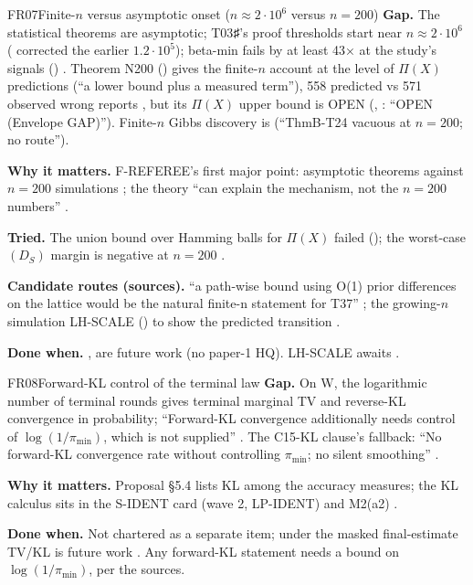 \begin{card}{FR07}{Finite-$n$ versus asymptotic onset ($n\approx2\cdot10^6$ versus $n=200$)}
\textbf{Gap.} The statistical theorems are asymptotic; T03♯'s proof thresholds start near $n\approx2\cdot10^6$ ( corrected the earlier $1.2\cdot10^5$); beta-min fails by at least 43× at the study's signals () . Theorem N200 () gives the finite-$n$ account at the level of $\Pi(X)$ predictions (``a lower bound plus a measured term''), 558 predicted vs 571 observed wrong reports , but its $\Pi(X)$ upper bound is OPEN (, : ``OPEN (Envelope GAP)''). Finite-$n$ Gibbs discovery is  (``ThmB-T24 vacuous at $n=200$; no route'').

\textbf{Why it matters.} F-REFEREE's first major point: asymptotic theorems against $n=200$ simulations ; the theory ``can explain the mechanism, not the $n=200$ numbers'' .

\textbf{Tried.} The union bound over Hamming balls for $\Pi(X)$ failed (); the worst-case $(D_S)$ margin is negative at $n=200$ .

\textbf{Candidate routes (sources).} ``a path-wise bound using O(1) prior differences on the lattice would be the natural finite-n statement for T37'' ; the growing-$n$ simulation LH-SCALE () to show the predicted transition .

\textbf{Done when.} ,  are future work (no paper-1 HQ). LH-SCALE awaits .
\end{card}

\begin{card}{FR08}{Forward-KL control of the terminal law}
\textbf{Gap.} On W, the logarithmic number of terminal rounds gives terminal marginal TV and reverse-KL convergence in probability; ``Forward-KL convergence additionally needs control of $\log(1/\pi_{\min})$, which is not supplied'' . The C15-KL clause's fallback: ``No forward-KL convergence rate without controlling $\pi_{\min}$; no silent smoothing'' .

\textbf{Why it matters.} Proposal §5.4 lists KL among the accuracy measures; the KL calculus sits in the S-IDENT card  (wave 2, LP-IDENT) and M2(a2) .

\textbf{Done when.} Not chartered as a separate item; under  the masked final-estimate TV/KL is future work . Any forward-KL statement needs a bound on $\log(1/\pi_{\min})$, per the sources.
\end{card}


